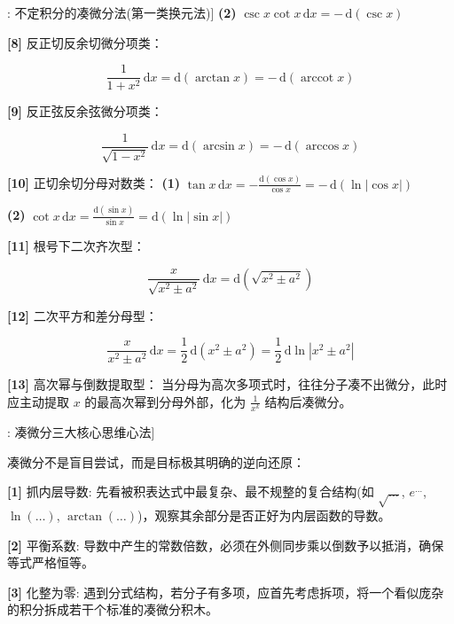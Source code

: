 \documentclass[11pt,a4paper,UTF8]{ctexart}
\begin{document}
\begin{thmbox}[方法[1]: 不定积分的凑微分法(第一类换元法)]
\textbf{(2)}  $\csc x\cot x\,\mathrm{d}x = -\,\mathrm{d}(\csc x)$

\textbf{[8]} 反正切反余切微分项类：

\begin{equation*}
\frac{1}{1+x^2}\,\mathrm{d}x = \mathrm{d}(\arctan x) = -\,\mathrm{d}(\operatorname{arccot} x)
\end{equation*}


\textbf{[9]} 反正弦反余弦微分项类：

\begin{equation*}
\frac{1}{\sqrt{1-x^2}}\,\mathrm{d}x = \mathrm{d}(\arcsin x) = -\,\mathrm{d}(\arccos x)
\end{equation*}


\textbf{[10]} 正切余切分母对数类：
\textbf{(1)}  $\tan x\,\mathrm{d}x = -\frac{\mathrm{d}(\cos x)}{\cos x} = -\,\mathrm{d}(\ln|\cos x|)$

\textbf{(2)}  $\cot x\,\mathrm{d}x = \frac{\mathrm{d}(\sin x)}{\sin x} = \mathrm{d}(\ln|\sin x|)$

\textbf{[11]} 根号下二次齐次型：

\begin{equation*}
\frac{x}{\sqrt{x^2 \pm a^2}}\,\mathrm{d}x = \mathrm{d}\left(\sqrt{x^2 \pm a^2}\right)
\end{equation*}


\textbf{[12]} 二次平方和差分母型：

\begin{equation*}
\frac{x}{x^2 \pm a^2}\,\mathrm{d}x = \frac{1}{2}\,\mathrm{d}(x^2 \pm a^2) = \frac{1}{2}\,\mathrm{d}\ln|x^2 \pm a^2|
\end{equation*}


\textbf{[13]} 高次幂与倒数提取型：
当分母为高次多项式时，往往分子凑不出微分，此时应主动提取 $x$ 的最高次幂到分母外部，化为 $\frac{1}{x^k}$ 结构后凑微分。

\end{thmbox}
\begin{thmbox}[原理[1]: 凑微分三大核心思维心法]

凑微分不是盲目尝试，而是目标极其明确的逆向还原：

\textbf{[1]} 抓内层导数: 先看被积表达式中最复杂、最不规整的复合结构(如 $\sqrt{\dots}$, $e^{\dots}$, $\ln(\dots)$, $\arctan(\dots)$)，观察其余部分是否正好为内层函数的导数。

\textbf{[2]} 平衡系数: 导数中产生的常数倍数，必须在外侧同步乘以倒数予以抵消，确保等式严格恒等。

\textbf{[3]} 化整为零: 遇到分式结构，若分子有多项，应首先考虑拆项，将一个看似庞杂的积分拆成若干个标准的凑微分积木。

\end{thmbox}
\end{document}
